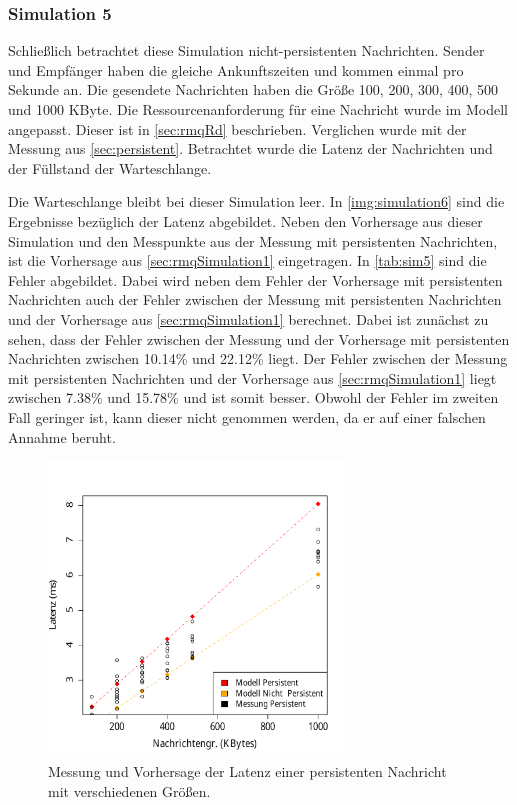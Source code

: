 \subsubsection{Simulation 5}
Schließlich betrachtet diese Simulation nicht-persistenten Nachrichten. Sender und Empfänger haben die gleiche Ankunftszeiten und kommen einmal pro Sekunde an. Die gesendete Nachrichten haben die Größe 100, 200, 300, 400, 500 und 1000 KByte. Die Ressourcenanforderung für eine Nachricht wurde im Modell angepasst. Dieser ist in \autoref{sec:rmqRd} beschrieben. Verglichen wurde mit der Messung aus \autoref{sec:persistent}. Betrachtet wurde die Latenz der Nachrichten und der Füllstand der Warteschlange. \par
Die Warteschlange bleibt bei dieser Simulation leer. In \autoref{img:simulation6} sind die Ergebnisse bezüglich der Latenz abgebildet. Neben den Vorhersage aus dieser Simulation und den Messpunkte aus der Messung mit persistenten Nachrichten, ist die Vorhersage aus \autoref{sec:rmqSimulation1} eingetragen. In \autoref{tab:sim5} sind die Fehler abgebildet. Dabei wird neben dem Fehler der Vorhersage mit persistenten Nachrichten auch der Fehler zwischen der Messung mit persistenten Nachrichten und der Vorhersage aus \autoref{sec:rmqSimulation1} berechnet. Dabei ist zunächst zu sehen, dass der Fehler zwischen der Messung und der Vorhersage mit persistenten Nachrichten zwischen 10.14\% und 22.12\% liegt. Der Fehler zwischen der Messung mit persistenten Nachrichten und der Vorhersage aus \autoref{sec:rmqSimulation1} liegt zwischen 7.38\% und 15.78\% und ist somit besser. Obwohl der Fehler im zweiten Fall geringer ist, kann dieser nicht genommen werden, da er auf einer falschen Annahme beruht.
\begin{figure}
\center
  \includegraphics[width=0.7\textwidth]{images/modelSimulationResults/simulation6.pdf}
  \caption{Messung und Vorhersage der Latenz einer persistenten Nachricht mit verschiedenen Größen.}
  \label{img:simulation6}
\end{figure}


